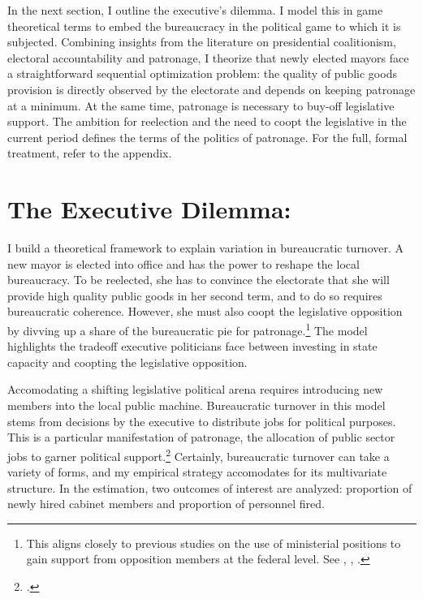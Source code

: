 \documentclass[12pt,]{book}
\let\rmarkdownfootnote\footnote%
\def\footnote{\protect\rmarkdownfootnote}
\begin{document}
In the next section, I outline the executive's dilemma. I model this in game theoretical terms to embed the bureaucracy in the political game to which it is subjected. Combining insights from the literature on presidential coalitionism, electoral accountability and patronage, I theorize that newly elected mayors face a straightforward sequential optimization problem: the quality of public goods provision is directly observed by the electorate and depends on keeping patronage at a minimum. At the same time, patronage is necessary to buy-off legislative support. The ambition for reelection and the need to coopt the legislative in the current period defines the terms of the politics of patronage. For the full, formal treatment, refer to the appendix.

\hypertarget{the-executive-dilemma}{%
\section{The Executive Dilemma:}\label{the-executive-dilemma}}

I build a theoretical framework to explain variation in bureaucratic turnover. A new mayor is elected into office and has the power to reshape the local bureaucracy. To be reelected, she has to convince the electorate that she will provide high quality public goods in her second term, and to do so requires bureaucratic coherence. However, she must also coopt the legislative opposition by divving up a share of the bureaucratic pie for patronage.\footnote{This aligns closely to previous studies on the use of ministerial positions to gain support from opposition members at the federal level. See \citet{loureiro_politica_1999}, \citet{loureiro_radiografia_2014}, \citet{lopez_cargos_2018}.} The model highlights the tradeoff executive politicians face between investing in state capacity and coopting the legislative opposition.

Accomodating a shifting legislative political arena requires introducing new members into the local public machine. Bureaucratic turnover in this model stems from decisions by the executive to distribute jobs for political purposes. This is a particular manifestation of patronage, the allocation of public sector jobs to garner political support.\footnote{\citet{brollo_victor_2017}.} Certainly, bureaucratic turnover can take a variety of forms, and my empirical strategy accomodates for its multivariate structure. In the estimation, two outcomes of interest are analyzed: proportion of newly hired cabinet members and proportion of personnel fired.
\end{document}
